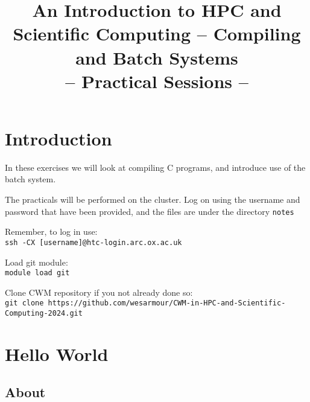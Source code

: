 \documentclass[a4paper, 12pt]{article}
\title{{\Huge\bf An Introduction to HPC and Scientific Computing -- Compiling and Batch Systems\footnotetext{Thanks to Jacob Wilkins and Ian Bush for materials.}} \\ {\huge -- Practical Sessions --}}
\date{}
\def \cc   {\tt }               %
\begin{document}
\maketitle

\vfill

\tableofcontents

\newpage


\section{Introduction}
\label{Introduction}

In these exercises we will look at compiling C programs, and introduce use of the batch system.

The practicals will be performed on the cluster. Log on using the username and password that have been provided, and the files are under the directory {\cc notes}

Remember, to log in use: \\
{\cc ssh -CX [username]@htc-login.arc.ox.ac.uk}

Load git module: \\
{\cc module load git}

Clone CWM repository if you not already done so: \\
{\cc  git clone https://github.com/wesarmour/CWM-in-HPC-and-Scientific-Computing-2024.git}




\section{Hello World}
\label{basics}

\subsection*{About}
\end{document}
